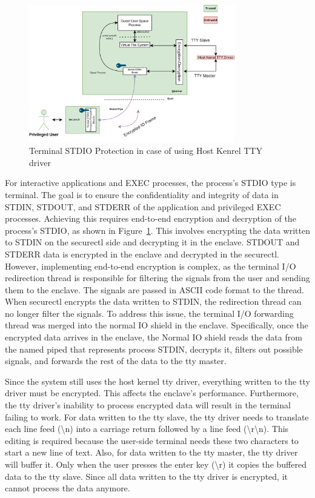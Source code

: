 \begin{figure}[H]
    \centering
    \includegraphics[width=0.8\textwidth]{images/terminal_shiled2.png}
    \caption[Terminal STDIO Protection in case of using Host Kenrel TTY Driver]{Terminal STDIO Protection in case of using Host Kenrel TTY driver}
    \label{fig:terminal_shiled2}
\end{figure}

For interactive applications and EXEC processes, the process's STDIO type is terminal. The goal is to ensure the confidentiality and integrity of data in STDIN, STDOUT, and STDERR of the application and privileged EXEC processes. Achieving this 
requires end-to-end encryption and decryption of the process's STDIO, as shown in Figure~\ref{fig:terminal_shiled2}. This involves encrypting the data written to STDIN on the securectl side and decrypting it in the enclave. STDOUT and STDERR data is encrypted in the enclave and decrypted in the 
securectl. However, implementing end-to-end encryption is complex, as the terminal I/O redirection thread is responsible for filtering the signals from the user and sending them to the enclave. The signals are passed in ASCII code format to the 
thread. When securectl encrypts the data written to STDIN, the redirection thread can no longer filter the signals. To address this issue, the terminal I/O forwarding thread was merged into the normal IO shield in the enclave. Specifically, once 
the encrypted data arrives in the enclave, the Normal IO shield reads the data from the named piped that represents process STDIN, decrypts it, filters out possible signals, and forwards the rest of the data to the tty master.

Since the system still uses the host kernel tty driver, everything written to the tty driver must be encrypted. This affects the enclave's performance. Furthermore, the tty driver's inability to process encrypted data will result in the terminal 
failing to work. For data written to the tty slave, the tty driver needs to translate each line feed (\textbackslash n) into a carriage return followed by a line feed (\textbackslash r\textbackslash n). This editing is required because the user-side terminal needs these two characters 
to start a new line of text. Also, for data written to the tty master, the tty driver will buffer it. Only when the user presses the enter key (\textbackslash r) it copies the buffered data to the tty slave. Since all data written to the tty driver is encrypted, 
it cannot process the data anymore.

